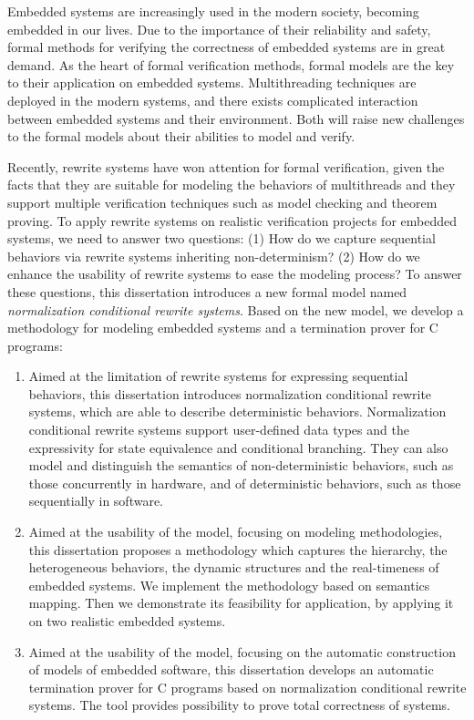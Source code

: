 \begin{eabstract}

Embedded systems are increasingly used in the modern society, becoming 
embedded in our lives. Due to the importance of their reliability and safety, 
formal methods for verifying the correctness of embedded systems are in great demand. As the heart of formal verification methods, formal models are the key to their application on embedded systems. Multithreading techniques are deployed in the modern systems, and there exists complicated interaction between embedded systems and their environment. Both will raise new challenges to the formal models about their abilities to model and verify.

Recently, rewrite systems have won attention for formal verification, given the facts that they are suitable for modeling the behaviors of multithreads and they support multiple verification techniques such as model checking and theorem proving. To apply rewrite systems on realistic verification projects for embedded systems, we need to answer two questions: (1) How do we capture sequential behaviors via rewrite systems inheriting non-determinism? (2) How do we enhance the usability of rewrite systems to ease the modeling process? To answer these questions, this dissertation introduces a new formal model named \emph{normalization conditional rewrite systems}. Based on the new model, we develop a methodology for modeling embedded systems and a termination prover \CTerm for C programs:

\begin{enumerate}
\item Aimed at the limitation of rewrite systems for expressing sequential behaviors, this dissertation introduces normalization conditional rewrite systems, which are able to describe deterministic behaviors. Normalization conditional rewrite systems support user-defined data types and the expressivity for state equivalence and conditional branching. They can also model and distinguish the semantics of non-deterministic behaviors, such as those concurrently in hardware, and of deterministic behaviors, such as those sequentially in software. 
\item Aimed at the usability of the model, focusing on modeling methodologies, this dissertation proposes a methodology which captures the hierarchy, the heterogeneous behaviors, the dynamic structures and the real-timeness of embedded systems. We implement the methodology based on semantics mapping. Then we demonstrate its feasibility for application, by applying it on two realistic embedded systems. 
\item Aimed at the usability of the model, focusing on the automatic construction of models of embedded software, this dissertation develops an automatic termination prover \CTerm for C programs based on normalization conditional rewrite systems. The tool provides possibility to prove total correctness of systems.  
\end{enumerate}


\end{eabstract}
